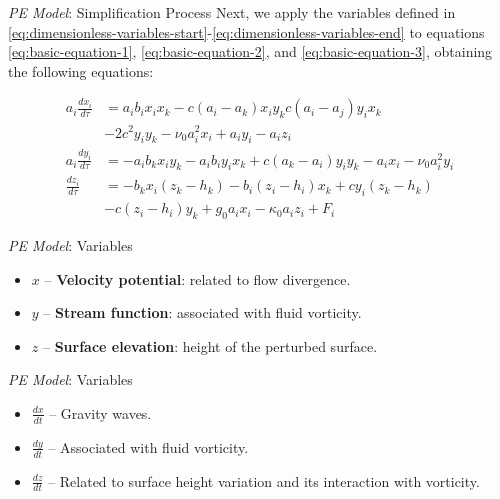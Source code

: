 \begin{frame}{\textit{PE Model}: Simplification Process}
	Next, we apply the variables defined in \eqref{eq:dimensionless-variables-start}-\eqref{eq:dimensionless-variables-end} to equations \eqref{eq:basic-equation-1}, \eqref{eq:basic-equation-2}, and \eqref{eq:basic-equation-3}, obtaining the following equations:
	
	\begin{small}
		\begin{align}
			a_i\frac{dx_i}{d\tau} & = a_ib_ix_ix_k - c(a_i - a_k)x_iy_k  c(a_i - a_j)y_ix_k\nonumber                                           \\
			                      & -2c^2y_iy_k - \nu_0a_i^2x_i + a_iy_i - a_iz_i \label{eq:primary-equation-1}                                \\
			a_i\frac{dy_i}{d\tau} & = -a_ib_kx_iy_k - a_ib_iy_ix_k + c(a_k - a_i)y_iy_k - a_ix_i - \nu_0a_i^2y_i \label{eq:primary-equation-2} \\
			\frac{dz_i}{d\tau}    & = -b_kx_i(z_k - h_k) - b_i(z_i - h_i)x_k + cy_i(z_k - h_k) \nonumber                                       \\
			                      & - c(z_i - h_i)y_k + g_0a_ix_i - \kappa_0a_iz_i + F_i \label{eq:primary-equation-3}                         
		\end{align}
	\end{small}
\end{frame}

\begin{frame}{\textit{PE Model}: Variables}
	
	\begin{itemize}
		\item $x$ – \textbf{Velocity potential}: related to flow divergence.
		\item $y$ – \textbf{Stream function}: associated with fluid vorticity.
		\item $z$ – \textbf{Surface elevation}: height of the perturbed surface.
	\end{itemize}
	
\end{frame}


\begin{frame}{\textit{PE Model}: Variables}
	\begin{itemize}
		\item $\frac{dx}{dt}$ – Gravity waves.
		\item $\frac{dy}{dt}$ – Associated with fluid vorticity.
		\item $\frac{dz}{dt}$ – Related to surface height variation and its interaction with vorticity.
	\end{itemize}
	
\end{frame}

